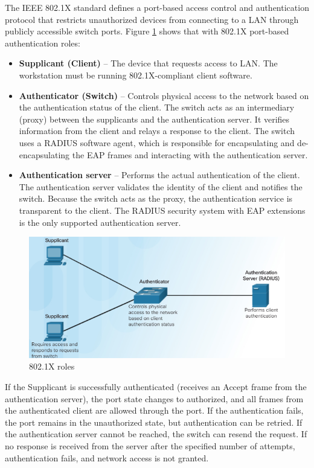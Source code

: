 The IEEE 802.1X standard defines a port-based access control and authentication protocol that restricts unauthorized devices from connecting to a LAN through publicly accessible switch ports. Figure \ref{802.1X} shows that with 802.1X port-based authentication roles:

\begin{itemize}
\item \textbf{Supplicant (Client)} -- The device that requests access to LAN. The workstation must be running 802.1X-compliant client software. 
\item \textbf{Authenticator (Switch)} -- Controls physical access to the network based on the authentication status of the client. The switch acts as an intermediary (proxy) between the supplicants and the authentication server. It verifies information from the client and relays a response to the client. The switch uses a RADIUS software agent, which is responsible for encapsulating and de-encapsulating the EAP frames and interacting with the authentication server.
\item \textbf{Authentication server} -- Performs the actual authentication of the client. The authentication server validates the identity of the client and notifies the switch. Because the switch acts as the proxy, the authentication service is transparent to the client. The RADIUS security system with EAP extensions is the only supported authentication server.
\end{itemize}

\begin{figure}[hbtp]
\caption{802.1X roles}\label{802.1X}
\centering
\includegraphics[scale=0.7]{pictures/8021X.PNG}
\end{figure}

If the Supplicant is successfully authenticated (receives an Accept frame from the authentication server), the port state changes to authorized, and all frames from the authenticated client are allowed through the port. If the authentication fails, the port remains in the unauthorized state, but authentication can be retried. If the authentication server cannot be reached, the switch can resend the request. If no response is received from the server after the specified number of attempts, authentication fails, and network access is not granted.

